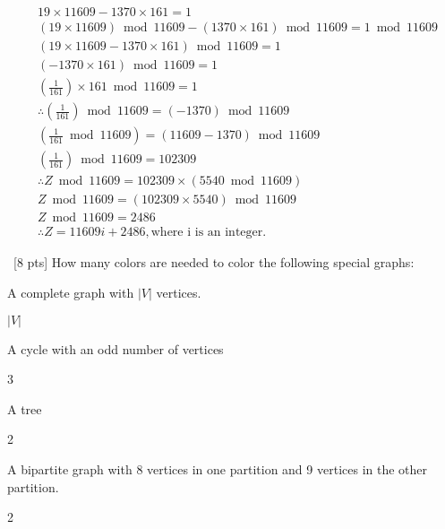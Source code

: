\documentclass[12pt]{article}
\newenvironment{sol}[1][Solution]{\begin{trivlist}\item[\hskip\labelsep {\bfseries #1:}]}{\end{trivlist}}
\begin{document}
\begin{enumerate}
\begin{sol}
\begin{center}
\begin{tabular}{|c|c|c|c|c|c|c|}
        \hline
        \end{tabular}
        \begin{align*}
            & 19 \times 11609 - 1370 \times 161 = 1\\
            & (19 \times 11609) \bmod 11609 - (1370 \times 161) \bmod 11609 =  1 \bmod 11609\\
            & (19 \times 11609-1370 \times 161) \bmod 11609 = 1  \\
             & (- 1370 \times 161) \bmod 11609 = 1\\
            & (\frac{1}{161}) \times 161 \bmod 11609 = 1 \\ 
            & \therefore (\frac{1}{161})\bmod 11609 = (-1370) \bmod 11609\\
            & (\frac{1}{161} \bmod 11609) = (11609 - 1370) \bmod 11609\\
            & (\frac{1}{161}) \bmod 11609 = 102309\\
            & \therefore Z \bmod 11609 = 102309 \times (5540 \bmod 11609) \\
            & Z \bmod 11609 = (102309 \times 5540) \bmod 11609\\
            & Z \bmod 11609 = 2486\\
            & \therefore Z = 11609i + 2486, \text{where i is an integer}.
        \end{align*}
    \end{center}
    \end{sol}

    \item \ [8 pts] How many colors are needed to color the following special graphs:
    \begin{enumerate}
        \item A complete graph with $|V|$ vertices.
        \begin{sol}
        $|V|$
        \end{sol}
        \item A cycle with an odd number of vertices
        \begin{sol}
        3
        \end{sol}
        \item A tree
        \begin{sol}
        2
        \end{sol}
        \item A bipartite graph with 8 vertices in one partition and 9 vertices in the other partition.
        \begin{sol}
        2
        \end{sol}
    \end{enumerate}


\end{enumerate}
\end{document}
